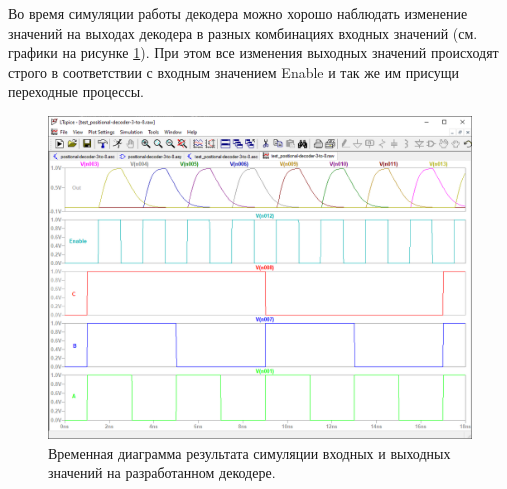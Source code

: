 Во время симуляции работы декодера можно хорошо наблюдать изменение значений на
выходах декодера в разных комбинациях входных значений (см. графики на рисунке
\ref{fig:decoder-simulation}). При этом все изменения выходных значений
происходят строго в соответствии с входным значением Enable и так же им присущи
переходные процессы. 
\begin{figure}[!htb]
    \centering
    \includegraphics[width=\textwidth]{res/3-to-8-decoder_simulation.png}
    \caption{Временная диаграмма результата симуляции входных и выходных значений на разработанном декодере.}
    \label{fig:decoder-simulation}
\end{figure}

